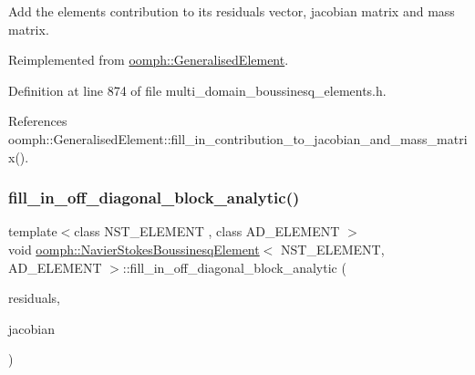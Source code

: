 Add the element\textquotesingle{}s contribution to its residuals vector, jacobian matrix and mass matrix. 



Reimplemented from \hyperlink{classoomph_1_1GeneralisedElement_a2b6294a730647cf865da94f2531466f8}{oomph\+::\+Generalised\+Element}.



Definition at line 874 of file multi\+\_\+domain\+\_\+boussinesq\+\_\+elements.\+h.



References oomph\+::\+Generalised\+Element\+::fill\+\_\+in\+\_\+contribution\+\_\+to\+\_\+jacobian\+\_\+and\+\_\+mass\+\_\+matrix().

\mbox{\label{classoomph_1_1NavierStokesBoussinesqElement_a342613c3ceeaf4b5bb86c77dc150372d}} 
\subsubsection{\texorpdfstring{fill\+\_\+in\+\_\+off\+\_\+diagonal\+\_\+block\+\_\+analytic()}{fill\_in\_off\_diagonal\_block\_analytic()}}
{\footnotesize\ttfamily template$<$class N\+S\+T\+\_\+\+E\+L\+E\+M\+E\+NT , class A\+D\+\_\+\+E\+L\+E\+M\+E\+NT $>$ \\
void \hyperlink{classoomph_1_1NavierStokesBoussinesqElement}{oomph\+::\+Navier\+Stokes\+Boussinesq\+Element}$<$ N\+S\+T\+\_\+\+E\+L\+E\+M\+E\+NT, A\+D\+\_\+\+E\+L\+E\+M\+E\+NT $>$\+::fill\+\_\+in\+\_\+off\+\_\+diagonal\+\_\+block\+\_\+analytic (\begin{DoxyParamCaption}\item[{\hyperlink{classoomph_1_1Vector}{Vector}$<$ double $>$ \&}]{residuals,  }\item[{\hyperlink{classoomph_1_1DenseMatrix}{Dense\+Matrix}$<$ double $>$ \&}]{jacobian }\end{DoxyParamCaption})\hspace{0.3cm}{\ttfamily [inline]}}



